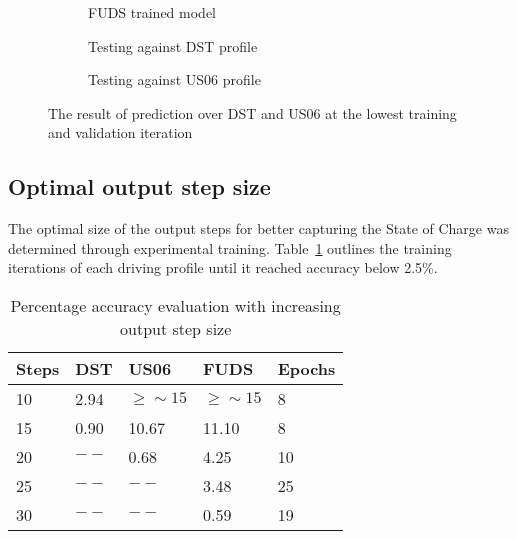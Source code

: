     \begin{figure}[htbp]
        \centering
        \begin{subfigure}[b]{0.325\textwidth}
            \centering
            
            \caption{FUDS trained model}
            \label{subfig:FUDS_diff_prof_best}
        \end{subfigure}
        \hfill
        \begin{subfigure}[b]{0.325\textwidth}
            \centering
            
            \caption{Testing against DST profile}
            \label{subfig:DST_diff_prof_best}
        \end{subfigure}
        \hfill
        \begin{subfigure}[b]{0.325\textwidth}
            \centering
            
            \caption{Testing against US06 profile}
            \label{subfig:US_diff_prof_best}
        \end{subfigure}
        \caption{The result of prediction over DST and US06 at the lowest training and validation iteration}
        \label{fig:diff_prof_best}
    \end{figure}
\subsection{Optimal output step size}
    The optimal size of the output steps for better capturing the State of Charge was determined through experimental training. Table~\ref{tab:out_steps} outlines the training iterations of each driving profile until it reached accuracy below 2.5\%.
    \begin{table}[htbp]
        \centering
        \caption{Percentage accuracy evaluation with increasing output step size}
        \label{tab:out_steps}
        \begin{tabular}{ p{1.5cm} || p{1.5cm} p{1.5cm} p{1.5cm} || p{1.5cm}  }
            \hline
            Steps & DST & US06 & FUDS & Epochs \\
            \hline
            10 & 2.94 & $\geq\sim 15$ & $\geq\sim 15$ & 8 \\
            15 & 0.90 & 10.67 & 11.10 & 8 \\
            20 & $--$ & 0.68  &  4.25 & 10 \\
            25 & $--$ & $--$  &  3.48 & 25 \\
            30 & $--$ & $--$  &  0.59 & 19 \\
            \hline
        \end{tabular}
    \end{table}
    
